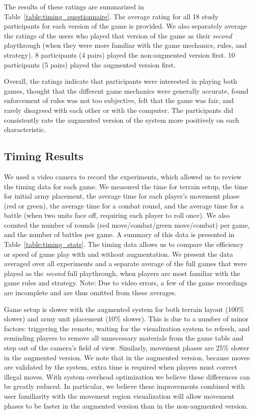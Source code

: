 \documentclass[review]{vgtc}                 %
\begin{document}
The results of these ratings are summarized in
Table~\ref{table:timing_questionnaire}.  The average rating for all
18 study participants for each version of the game is provided.  We
also separately average the ratings of the users who played that
version of the game as their \emph{second} playthrough (when they were more familiar with the game
mechanics, rules, and strategy).  8 participants (4 pairs) played the
non-augmented version first.  10 participants (5 pairs) played the
augmented version first.

Overall, the ratings indicate that participants were interested in
playing both games, thought that the different game mechanics
were generally accurate, found enforcement of rules was not too
subjective, felt that the game was fair, and rarely
disagreed with each other or with the computer.  The
participants did consistently rate the
augmented version of the system more positively on each
characteristic. 


\subsection{Timing Results}

We used a video camera to record the experiments, which allowed us to
review the timing data for each game.  We measured the time for
terrain setup, the time for initial army placement, the average time
for each player's movement phase (red or green), the average time for
a combat round, and the average time for a battle (when two units
face off, requiring each player to roll once).  We also counted the
number of rounds (red move/combat/green move/combat) per game, and the
number of battles per game. 
A summary of this data is presented in
Table~\ref{table:timing_stats}.  The timing data allows us to compare
the efficiency or speed of game play with and without augmentation.
We present the data averaged over all experiments and a separate
average of the full games that were played as the {\em second} full playthrough, when players
are most familiar with the game rules and strategy.  Note: Due to
video errors, a few of the game recordings are incomplete and are thus
omitted from these averages.

Game setup is slower with the augmented system for both terrain layout
(100\% slower) and army unit placement (10\% slower).  This is due to
a number of minor factors: triggering the remote, waiting for the
visualization system to refresh, and reminding players to remove all
unnecessary materials from the game table and step out of the
camera's field of view.  Similarly, movement phases are 25\% slower
in the augmented version.  We note that in the augmented version,
because moves are validated by the system, extra time is required when
players must correct illegal moves.  With system overhead optimization
we believe these differences can be greatly reduced.  In particular, we
believe these improvements combined with user familiarity with the movement
region visualization will allow movement phases to be
faster in the augmented version than in the non-augmented version.
\end{document}
